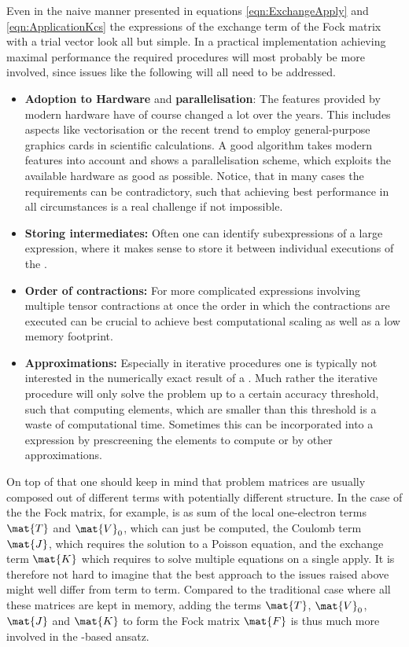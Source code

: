 Even in the naive manner presented
in equations \eqref{eqn:ExchangeApply} and \eqref{eqn:ApplicationKcs}
the \contraction expressions
of the exchange term of the Fock matrix with a trial vector
look all but simple.
In a practical implementation achieving maximal performance
the required procedures will most probably be more involved,
since issues like the following will all need to be addressed.
\begin{itemize}
	\item \textbf{Adoption to Hardware} and \textbf{parallelisation}:
		The features provided by modern hardware
		have of course changed a lot over the years.
		This includes aspects like vectorisation
		or the recent trend to employ general-purpose graphics cards
		in scientific calculations.
		A good algorithm takes modern features into account
		and shows a parallelisation scheme,
		which exploits the available hardware as good as possible.
		Notice, that in many cases the requirements
		can be contradictory,
		such that achieving best performance in all circumstances
		is a real challenge if not impossible.
	\item \textbf{Storing intermediates:}
		Often one can identify subexpressions
		of a large \contraction expression,
		where it makes sense to store it between individual
		executions of the \contraction.
	\item \textbf{Order of contractions:}
		For more complicated expressions involving
		multiple tensor contractions at once the order
		in which the contractions are executed can be crucial
		to achieve best computational scaling
		as well as a low memory footprint.
	\item \textbf{Approximations:}
		Especially in iterative procedures one is typically not
		interested in the numerically exact result
		of a \contraction.
		Much rather the iterative procedure will only solve
		the problem up to a certain accuracy threshold,
		such that computing elements,
		which are smaller than this threshold is a waste of computational time.
		Sometimes this can be incorporated into a \contraction expression
		by prescreening the elements to compute or by other approximations.
\end{itemize}
On top of that one should keep in mind that problem matrices
are usually composed out of different terms
with potentially different structure.
In the case of the \SCF the Fock matrix, for example,
is as sum of the local one-electron terms $\mat{T}$ and $\mat{V}_0$,
which can just be computed,
the Coulomb term $\mat{J}$,
which requires the solution to a Poisson equation,
and the exchange term $\mat{K}$ which requires to solve
multiple equations on a single apply.
It is therefore not hard to imagine
that the best approach to the issues raised above might
well differ from term to term.
Compared to the traditional case where all these matrices
are kept in memory,
adding the terms $\mat{T}$, $\mat{V}_0$, $\mat{J}$
and $\mat{K}$ to form the Fock matrix $\mat{F}$
is thus much more involved in the \contraction-based ansatz.

